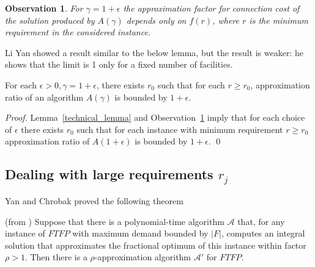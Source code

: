 \documentclass{llncs}
\newtheorem{observation}{\textbf{Observation}}
\begin{document}
\begin{observation}
 \label{nice_observation}
 For $\gamma = 1 + \epsilon$ the approximation factor for connection cost of the solution produced by $A(\gamma)$ depends only on $f(r)$, where $r$ is the minimum requirement in the considered instance.
\end{observation}

Li Yan showed \cite{liyan_phd} a result similar to the below lemma, but the result is weaker: he shows that the limit is 1 only for a fixed number of facilities.

\begin{lemma}
\label{1_epsilon}
 For each $\epsilon > 0, \gamma = 1 + \epsilon$, there exists $r_0$ such that for each $r \geq r_0$, approximation ratio of an algorithm $A(\gamma)$ is bounded by $1 + \epsilon$.
\end{lemma}

\begin{proof}
 Lemma~\ref{technical_lemma} and Observation~\ref{nice_observation} imply that for each choice of $\epsilon$ there exists $r_0$ such that for each instance with minimum requirement $r \geq r_0$ approximation ratio of $A(1+\epsilon)$ is bounded by $1 + \epsilon$.
 \qed
\end{proof}

\subsection{Dealing with large requirements $r_j$}
Yan and Chrobak proved the following theorem

\begin{theorem} (from \cite{Yan})
\label{requirements_reduction}
 Suppose that there is a polynomial-time algorithm $\mathcal{A}$ that, for any instance of $FTFP$ with maximum demand bounded by $|F|$, computes an integral solution that approximates the fractional optimum of this instance within factor $\rho > 1$. Then there is a $\rho$-approximation algorithm $\mathcal{A'}$ for $FTFP$.
\end{theorem}
\end{document}

